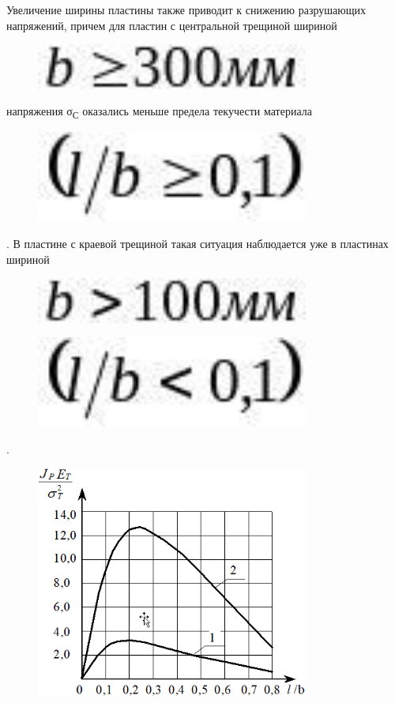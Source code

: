 Увеличение ширины пластины также приводит к снижению разрушающих
напряжений, причем для пластин с центральной трещиной шириной
\begin{figure}[H]
	\centering
	\includegraphics[width=0.8\textwidth]{assets/1184}
	\caption*{}
\end{figure} напряжения σ\textsubscript{С}
оказались меньше предела текучести материала
\begin{figure}[H]
	\centering
	\includegraphics[width=0.8\textwidth]{assets/1185}
	\caption*{}
\end{figure}. В пластине с краевой трещиной такая
ситуация наблюдается уже в пластинах шириной
\begin{figure}[H]
	\centering
	\includegraphics[width=0.8\textwidth]{assets/1186}
	\caption*{}
\end{figure} \begin{figure}[H]
	\centering
	\includegraphics[width=0.8\textwidth]{assets/1187}
	\caption*{}
\end{figure}.

\begin{figure}[H]
	\centering
	\includegraphics[width=0.8\textwidth]{assets/1188}
	\caption*{}
\end{figure}

